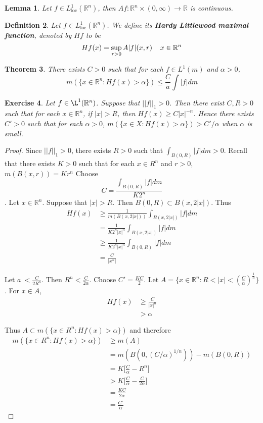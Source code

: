 \documentclass[12pt]{amsart}
\newtheorem{thm}{Theorem}[section]
\newtheorem{lem}[thm]{Lemma}
\newtheorem{defn}[thm]{Definition}
\newtheorem{ex}[thm]{Exercise}
\newcommand{\al}{\alpha}
\newcommand{\R}{\mathbb{R}}
\newcommand{\Ll}{L^1_{\text{loc}}(\R^n)}
\begin{document}
\begin{lem}
Let $f \in \Ll$, then $Af:\R^n \times (0, \infty)\rightarrow \R$ is continuous.
\end{lem}

\begin{defn}
Let $f \in \Ll$. We define its \textbf{Hardy Littlewood maximal function}, denoted by $Hf$ to be $$Hf(x) = \sup_{r>0} A|f|(x,r) \hspace{4mm} x \in \R^n$$
\end{defn}

\begin{thm}
There exists $C >0$ such that for each $f \in L^1(m)$ and $\al > 0$, $$m(\{x \in \R^n: Hf(x) > \al\}) \leq \frac{C}{a} \int |f|dm$$
\end{thm}

\begin{ex}
Let $f \in \L^1(\R^n)$. Suppose that $||f||_1>0$. Then there exist $C,R>0$ such that for each $x \in \R^n$, if $|x| > R$, then $Hf(x) \geq C|x|^{-n}$. Hence there exists $C' > 0$ such that for each $\al >0$, $m(\{x \in X: Hf(x)>\alpha\}) > C'/\al$ when $\al$ is small. 
\end{ex}

\begin{proof}
Since $||f||_1 >0$, there exists $R>0$ such that $\int_{B(0,R)}|f|dm >0$. Recall that there exists $K>0$ such that for each $x \in R^n$ and $r>0$, $m(B(x,r)) = Kr^n$ Choose $$C = \frac{\int_{B(0,R)}|f|dm}{K2^n}$$. Let $x \in \R^n$. Suppose that $|x|>R$. Then $B(0,R) \subset B(x,2|x|)$. Thus 
\begin{align*}
Hf(x) 
&\geq \frac{1}{m(B(x,2|x|))}\int_{B(x,2|x|)}|f|dm\\
&= \frac{1}{K2^n|x|^n}\int_{B(x,2|x|)}|f|dm \\
&\geq \frac{1}{K2^n|x|^n}\int_{B(0,R)}|f|dm \\
&= \frac{C}{|x^n|}
\end{align*}

Let $a\ < \frac{C}{2R^n}$. Then $R^n < \frac{C}{2 \al}$. Choose $C' =\frac{KC}{2}$. Let $A = \{x \in \R^n: R < |x|< (\frac{C}{\al})^{\frac{1}{n}}\}$. For $x \in A$, 
\begin{align*}
Hf(x) 
&\geq \frac{C}{|x|^n} \\
& > \al
\end{align*}

Thus $A \subset m(\{x \in R^n: Hf(x)> \al\})$ and therefore 
\begin{align*}
m(\{x \in R^n: Hf(x)> \al\}) 
&\geq m(A) \\
&= m(B(0,(C/\al)^{1/n})) - m(B(0,R)) \\
&= K\bigg [\frac{C}{\al} - R^n \bigg] \\
&> K\bigg[\frac{C}{\al} - \frac{C}{2 \al}\bigg] \\
&= \frac{KC}{2 \al}\\
&= \frac{C'}{\al}
\end{align*}
\end{proof}
\end{document}
